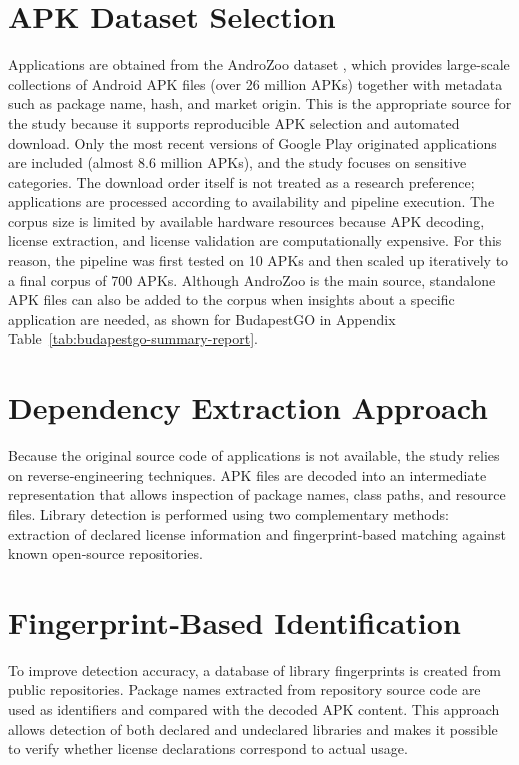 \documentclass[12pt,a4paper]{report}
\begin{document}
\section{APK Dataset Selection}
Applications are obtained from the AndroZoo dataset \parencite{liuAndroZooOpenCollectingLargescale2020}, which provides large-scale collections of Android APK files (over 26 million APKs) together with metadata such as package name, hash, and market origin. This is the appropriate source for the study because it supports reproducible APK selection and automated download. Only the most recent versions of Google Play originated applications are included (almost 8.6 million APKs), and the study focuses on sensitive categories. The download order itself is not treated as a research preference; applications are processed according to availability and pipeline execution. The corpus size is limited by available hardware resources because APK decoding, license extraction, and license validation are computationally expensive. For this reason, the pipeline was first tested on 10 APKs and then scaled up iteratively to a final corpus of 700 APKs. Although AndroZoo is the main source, standalone APK files can also be added to the corpus when insights about a specific application are needed, as shown for BudapestGO in Appendix Table~\ref{tab:budapestgo-summary-report}.

\section{Dependency Extraction Approach}
Because the original source code of applications is not available, the study relies on reverse‑engineering techniques. APK files are decoded into an intermediate representation that allows inspection of package names, class paths, and resource files. Library detection is performed using two complementary methods: extraction of declared license information and fingerprint‑based matching against known open‑source repositories.

\section{Fingerprint‑Based Identification}
To improve detection accuracy, a database of library fingerprints is created from public repositories. Package names extracted from repository source code are used as identifiers and compared with the decoded APK content. This approach allows detection of both declared and undeclared libraries and makes it possible to verify whether license declarations correspond to actual usage.
\end{document}
